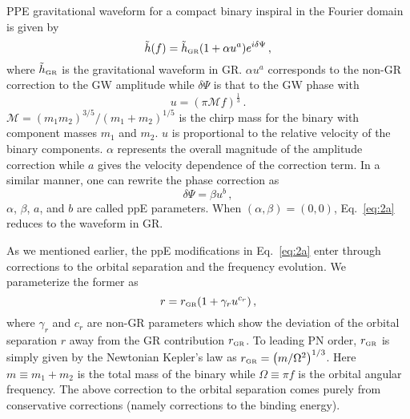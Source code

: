 \documentclass[prd,twocolumn,nofootinbib]{revtex4-1}
\newcommand{\GR}{{\mbox{\tiny GR}}}
\begin{document}
PPE gravitational waveform for a compact binary inspiral in the Fourier domain is given by ~\cite{Yunes:2009ke}
\begin{equation}\label{eq:2a}
\tilde{h}(f)=\tilde{h}_{\GR}(1+\alpha u^a)e^{i\delta\Psi}\,,
\end{equation}
% 
where $\tilde{h}_{\GR}$ is the gravitational waveform in GR. $\alpha u^a$ corresponds to the non-GR correction to the GW amplitude while  $\delta \Psi$ is that to the GW phase with 
\begin{equation}
u=(\pi \mathcal{M} f)^\frac{1}{3}\,.
\end{equation}
$\mathcal{M}=(m_1m_2)^{3/5}/(m_1+m_2)^{1/5}$ is the chirp mass for the binary with component masses $m_1$ and $m_2$. $u$ is proportional to the relative velocity of the binary components. $\alpha$ represents the overall magnitude of the amplitude correction while $a$ gives the velocity dependence of the correction term. In a similar manner, one can rewrite the phase correction as 
\begin{equation}\label{eq:2b}
\delta\Psi=\beta u^b\,,
\end{equation}
$\alpha$, $\beta$, $a$, and $b$ are called ppE parameters. When $(\alpha,\beta) = (0,0)$, Eq.~\eqref{eq:2a} reduces to the waveform in GR.


As we mentioned earlier, the ppE modifications in Eq.~\eqref{eq:2a} enter through corrections to the orbital separation and the frequency evolution.
We parameterize the former as
 \begin{equation}
 \label{eq:2k}
 r=r_{\GR}(1+\gamma_r u^{c_r})\,,
 \end{equation}
where $\gamma_r$ and $c_r$ are non-GR parameters which show the deviation of the orbital separation $r$ away from the GR contribution $r_{\GR}$. To leading PN order, $r_{\GR}$ is simply given by the Newtonian Kepler's law as $r_{\GR}=\left(m/\Omega^2\right)^{1/3}$. Here $m\equiv m_1+m_2$ is the total mass of the binary while $\Omega\equiv\pi f $ is the orbital angular frequency. The above correction to the orbital separation comes purely from conservative corrections (namely corrections to the binding energy).
\end{document}
